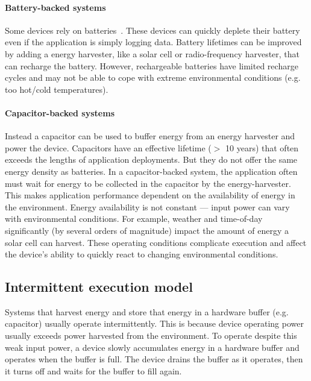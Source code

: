 \paragraph{Battery-backed systems}
Some devices rely on batteries~\cite{culler2002mica,jackson_2019,rowe2011sensor}.
% 
These devices can quickly deplete their battery even if the application is simply logging data.
% 
Battery lifetimes can be improved by adding a energy harvester, like a solar cell or radio-frequency harvester, that can recharge the battery.
% 
However, rechargeable batteries have limited recharge cycles and may not be able to cope with extreme environmental conditions (e.g. too hot/cold temperatures).

\paragraph{Capacitor-backed systems}
Instead a capacitor can be used to buffer energy from an energy harvester and power the device.
% 
Capacitors have an effective lifetime ($>$ 10 years) that often exceeds the lengths of application deployments.
% 
But they do not offer the same energy density as batteries.
% 
In a capacitor-backed system, the application often must wait for energy to be collected in the capacitor by the energy-harvester.
% 
This makes application performance dependent on the availability of energy in the environment.
% 
Energy availability is not constant --- input power can vary with environmental conditions.
% 
For example, weather and time-of-day significantly (by several orders of magnitude) impact the amount of energy a solar cell can harvest.
% 
These operating conditions complicate execution and affect the device's ability to quickly react to changing environmental conditions.

\subsection{Intermittent execution model}
\label{chapter:background:intermittent}
Systems that harvest energy and store that energy in a hardware buffer (e.g. capacitor) usually operate intermittently.
% 
This is because device operating power usually exceeds power harvested from the environment.
% 
To operate despite this weak input power, a device slowly accumulates energy in a hardware buffer and operates when the buffer is full. 
% 
The device drains the buffer as it operates, then it turns off and waits for the buffer to fill again.
% 

